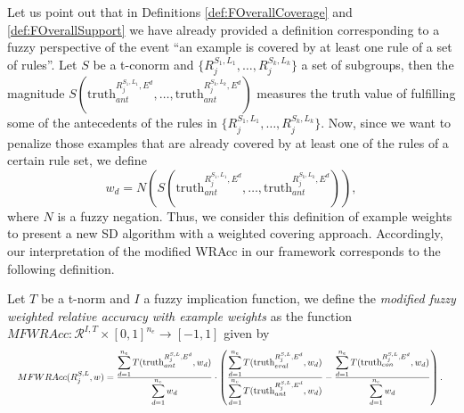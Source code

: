 Let us point out that in Definitions \ref{def:FOverallCoverage} and \ref{def:FOverallSupport} we have already provided a definition corresponding to a fuzzy perspective of the event ``an example is covered by at least one rule of a set of rules''. Let $S$ be a t-conorm and $\{R_j^{S_1,L_1}, \dots, R_j^{S_k,L_k}\}$ a set of subgroups, then the magnitude $S(\text{truth}_{ant}^{R^{S_1,L_1}_j,E^d}, \dots, \text{truth}_{ant}^{R^{S_k,L_k}_j,E^d})$ measures the truth value of fulfilling some of the antecedents of the rules in  $\{R_j^{S_1,L_1}, \dots, R_j^{S_k,L_k}\}$. Now, since we want to penalize those examples that are already covered by at least one of the rules of a certain rule set, we define 
\begin{equation}\label{eq:example_weights}
	w_d = N(S(\text{truth}_{ant}^{R^{S_1,L_1}_j,E^d}, \dots, \text{truth}_{ant}^{R^{S_k,L_k}_j,E^d})),
\end{equation}
where $N$ is a fuzzy negation. Thus, we consider this definition of example weights to present a new SD algorithm with a weighted covering approach. Accordingly, our interpretation of the modified WRAcc in our framework corresponds to the following definition.
\begin{definition}
	Let $T$ be a t-norm and $I$ a fuzzy implication function, we define the \emph{modified fuzzy weighted relative accuracy with example weights} as the function $MFWRAcc : \mathcal{R}^{I,T} \times [0,1]^{n_e} \to [-1,1]$ given by 
	\begin{equation*}
  \resizebox{\textwidth}{!}{%
	$MFWRAcc(R^{S,L}_j,w) = \frac{\displaystyle \sum_{d=1}^{n_e} T(\text{truth}_{ant}^{R^{S,L}_j,E^d},w_d)}{\displaystyle \sum_{d=1}^{n_e}w_d} \cdot \left( \frac{\displaystyle \sum_{d=1}^{n_e} T(\text{truth}_{eval}^{R^{S,L}_j,E^d},w_d)}{\displaystyle \sum_{d=1}^{n_e} T(\text{truth}_{ant}^{R^{S,L}_j,E^d},w_d)} - \frac{\displaystyle \sum_{d=1}^{n_e}T(\text{truth}_{con}^{R^{S,L}_j,E^d},w_d)}{\displaystyle \sum_{d=1}^{n_e}w_d}\right).$ }
	\end{equation*}
\end{definition}
